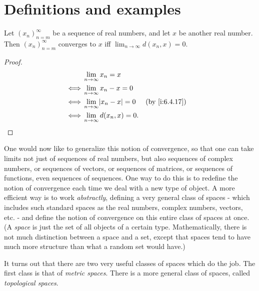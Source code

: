 \section{Definitions and examples}\label{ii:sec:1.1}

\begin{lem}\label{ii:1.1.1}
  Let \((x_n)_{n = m}^\infty\) be a sequence of real numbers, and let \(x\) be another real number.
  Then \((x_n)_{n = m}^\infty\) converges to \(x\) iff \(\lim_{n \to \infty} d(x_n, x) = 0\).
\end{lem}

\begin{proof}
  \begin{align*}
         & \lim_{n \to \infty} x_n = x                              \\
    \iff & \lim_{n \to \infty} x_n - x = 0                          \\
    \iff & \lim_{n \to \infty} \abs{x_n - x} = 0 &  & \by{i:6.4.17} \\
    \iff & \lim_{n \to \infty} d(x_n, x) = 0.
  \end{align*}
\end{proof}

\begin{note}
  One would now like to generalize this notion of convergence, so that one can take limits not just of sequences of real numbers, but also sequences of complex numbers, or sequences of vectors, or sequences of matrices, or sequences of functions, even sequences of sequences.
  One way to do this is to redefine the notion of convergence each time we deal with a new type of object.
  A more efficient way is to work \emph{abstractly}, defining a very general class of spaces - which includes such standard spaces as the real numbers, complex numbers, vectors, etc. - and define the notion of convergence on this entire class of spaces at once.
  (A \emph{space} is just the set of all objects of a certain type.
  Mathematically, there is not much distinction between a space and a set, except that spaces tend to have much more structure than what a random set would have.)
\end{note}

\begin{note}
  It turns out that there are two very useful classes of spaces which do the job.
  The first class is that of \emph{metric spaces}.
  There is a more general class of spaces, called \emph{topological spaces}.
\end{note}

